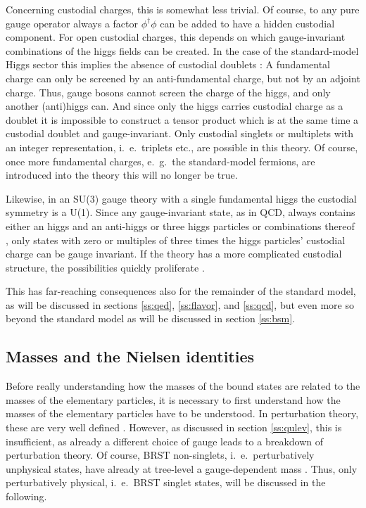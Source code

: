 \documentclass[final,12pt]{article}
\newcommand*{\1}{1\!\!\!\bot}
\begin{document}
Concerning custodial charges, this is somewhat less trivial. Of course, to any pure gauge operator always a factor $\phi^\dagger\phi$ can be added to have a hidden custodial component. For open custodial charges, this depends on which gauge-invariant combinations of the higgs fields can be created. In the case of the standard-model Higgs sector this implies the absence of custodial doublets \cite{Wurtz:2013ova,Maas:2014pba}: A fundamental charge can only be screened by an anti-fundamental charge, but not by an adjoint charge. Thus, gauge bosons cannot screen the charge of the higgs, and only another (anti)higgs can. And since only the higgs carries custodial charge as a doublet it is impossible to construct a tensor product which is at the same time a custodial doublet and gauge-invariant. Only custodial singlets or multiplets with an integer representation, i.\ e.\ triplets etc., are possible in this theory. Of course, once more fundamental charges, e.\ g.\ the standard-model fermions, are introduced into the theory this will no longer be true.

Likewise, in an SU(3) gauge theory with a single fundamental higgs the custodial symmetry is a U(1). Since any gauge-invariant state, as in QCD, always contains either an higgs and an anti-higgs or three higgs particles or combinations thereof \cite{Iida:2007qp,Maas:2016ngo,Maas:2017xzh}, only states with zero or multiples of three times the higgs particles' custodial charge can be gauge invariant. If the theory has a more complicated custodial structure, the possibilities quickly proliferate \cite{Wurtz:2009gf,Lewis:2010ps,Maas:2016qpu,Maas:2017xzh}.

This has far-reaching consequences also for the remainder of the standard model, as will be discussed in sections \ref{ss:qed}, \ref{ss:flavor}, and \ref{ss:qcd}, but even more so beyond the standard model as will be discussed in section \ref{ss:bsm}.

\subsection{Masses and the Nielsen identities}\label{ss:masses}

Before really understanding how the masses of the bound states are related to the masses of the elementary particles, it is necessary to first understand how the masses of the elementary particles have to be understood. In perturbation theory, these are very well defined \cite{Bohm:2001yx}. However, as discussed in section \ref{ss:qulev}, this is insufficient, as already a different choice of gauge leads to a breakdown of perturbation theory. Of course, BRST non-singlets, i.\ e.\ perturbatively unphysical states, have already at tree-level a gauge-dependent mass \cite{Bohm:2001yx}. Thus, only perturbatively physical, i.\ e.\ BRST singlet states, will be discussed in the following.
\end{document}
